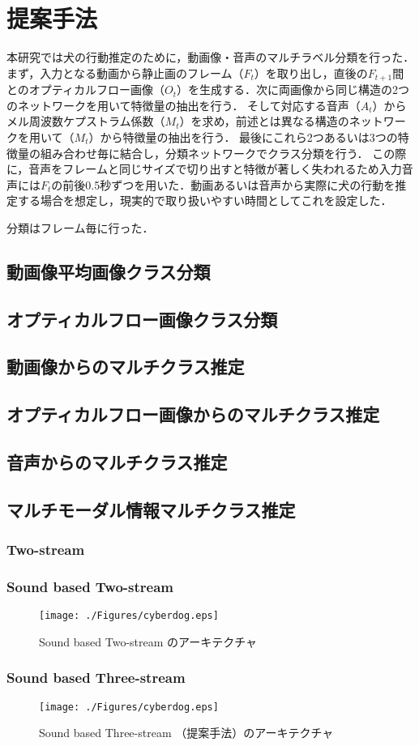 \chapter{提案手法}
本研究では犬の行動推定のために，動画像・音声のマルチラベル分類を行った．
まず，入力となる動画から静止画のフレーム（$F_t$）を取り出し，直後の$F_{t+1}$間とのオプティカルフロー画像（$O_t$）を生成する．次に両画像から同じ構造の2つのネットワークを用いて特徴量の抽出を行う．
そして対応する音声（$A_t$）からメル周波数ケプストラム係数（$M_t$）を求め，前述とは異なる構造のネットワークを用いて（$M_t$）から特徴量の抽出を行う．
最後にこれら2つあるいは3つの特徴量の組み合わせ毎に結合し，分類ネットワークでクラス分類を行う．
この際に，音声をフレームと同じサイズで切り出すと特徴が著しく失われるため入力音声には$F_t$の前後0.5秒ずつを用いた．動画あるいは音声から実際に犬の行動を推定する場合を想定し，現実的で取り扱いやすい時間としてこれを設定した．

分類はフレーム毎に行った．
\section{動画像平均画像クラス分類}
\section{オプティカルフロー画像クラス分類}
\section{動画像からのマルチクラス推定}
\section{オプティカルフロー画像からのマルチクラス推定}
\section{音声からのマルチクラス推定}
\section{マルチモーダル情報マルチクラス推定}
\subsection{Two-stream}
\subsection{Sound based Two-stream}
\begin{figure}[htbp]
 \begin{center}
  \texttt{[image: ./Figures/cyberdog.eps]}
  \caption{Sound based Two-stream のアーキテクチャ}
  \label{sound-two-stream}
 \end{center}
\end{figure}
\subsection{Sound based Three-stream}
\begin{figure}[htbp]
 \begin{center}
  \texttt{[image: ./Figures/cyberdog.eps]}
  \caption{Sound based Three-stream （提案手法）のアーキテクチャ}
  \label{sound-three-stream}
 \end{center}
\end{figure}
